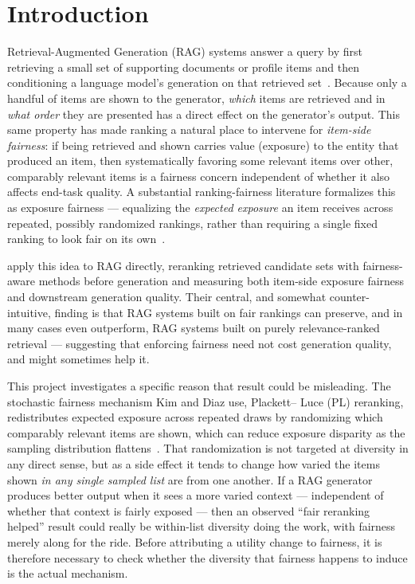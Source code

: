 \documentclass[11pt]{article}
\begin{document}
\section{Introduction}

Retrieval-Augmented Generation (RAG) systems answer a query by first
retrieving a small set of supporting documents or profile items and then
conditioning a language model's generation on that retrieved
set~\citep{lewis2020rag}. Because only a handful of items are shown to the
generator, \emph{which} items are retrieved and in \emph{what order} they
are presented has a direct effect on the generator's output. This same
property has made ranking a natural place to intervene for
\emph{item-side fairness}: if being retrieved and shown carries value
(exposure) to the entity that produced an item, then systematically
favoring some relevant items over other, comparably relevant items is a
fairness concern independent of whether it also affects end-task quality.
A substantial ranking-fairness literature formalizes this as exposure
fairness --- equalizing the \emph{expected exposure} an item receives
across repeated, possibly randomized rankings, rather than requiring a
single fixed ranking to look fair on
its own~\citep{singh2018fairness,biega2018equity,diaz2020expectedexposure}.

\citet{kim2025fairrag} apply this idea to RAG directly,
reranking retrieved candidate sets with fairness-aware methods before
generation and measuring both item-side exposure fairness and downstream
generation quality. Their central, and somewhat counter-intuitive, finding
is that RAG systems built on fair rankings can preserve, and in many
cases even outperform, RAG systems built on purely relevance-ranked
retrieval --- suggesting that enforcing fairness need not cost generation
quality, and might sometimes help it.

This project investigates a specific reason that result could be
misleading. The stochastic fairness mechanism Kim and Diaz use, Plackett--
Luce (PL) reranking, redistributes expected exposure across repeated
draws by randomizing which comparably relevant items are shown, which can
reduce exposure disparity as the sampling distribution
flattens~\citep{plackett1975analysis,luce1959individual}. That randomization
is not targeted at diversity in any direct sense, but as a side effect it
tends to change how varied the items shown \emph{in any single sampled
list} are from one another. If a RAG generator produces better output when
it sees a more varied context --- independent of whether that context is
fairly exposed --- then an observed ``fair reranking helped'' result could
really be within-list diversity doing the work, with fairness merely along
for the ride. Before attributing a utility change to fairness, it is
therefore necessary to check whether the diversity that fairness happens
to induce is the actual mechanism.
\end{document}
